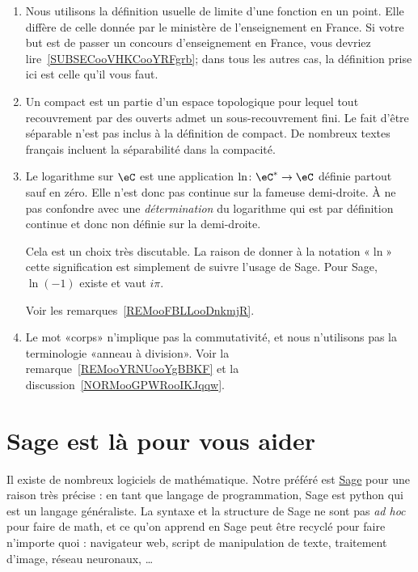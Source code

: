 \begin{enumerate}
    \item
        Nous utilisons la définition usuelle de limite d'une fonction en un point. Elle diffère de celle donnée par le ministère de l'enseignement en France. Si votre but est de passer un concours d'enseignement en France, vous devriez lire~\ref{SUBSECooVHKCooYRFgrb}; dans tous les autres cas, la définition prise ici est celle qu'il vous faut.
    \item
        Un compact est un partie d'un espace topologique pour lequel tout recouvrement par des ouverts admet un sous-recouvrement fini. Le fait d'être séparable n'est pas inclus à la définition de compact. De nombreux textes français incluent la séparabilité dans la compacité.
    \item
        Le logarithme sur \( \eC\) est une application \( \ln\colon \eC^*\to \eC\) définie partout sauf en zéro. Elle n'est donc pas continue sur la fameuse demi-droite. À ne pas confondre avec une \emph{détermination} du logarithme qui est par définition continue et donc non définie sur la demi-droite.

        Cela est un choix très discutable. La raison de donner à la notation «\( \ln\)» cette signification est simplement de suivre l'usage de Sage. Pour Sage, \( \ln(-1)\) existe et vaut \( i\pi\).

        Voir les remarques~\ref{REMooFBLLooDnkmjR}.
    \item
        Le mot «corps» n'implique pas la commutativité, et nous n'utilisons pas la terminologie «anneau à division». Voir la remarque~\ref{REMooYRNUooYgBBKF} et la discussion~\ref{NORMooGPWRooIKJqqw}.

\end{enumerate}

\section{Sage est là pour vous aider}

Il existe de nombreux logiciels de mathématique. Notre préféré est \href{http://www.sagemath.org}{Sage} pour une raison très précise : en tant que langage de programmation, Sage est python qui est un langage généraliste. La syntaxe et la structure de Sage ne sont pas \emph{ad hoc} pour faire de math, et ce qu'on apprend en Sage peut être recyclé pour faire n'importe quoi : navigateur web, script de manipulation de texte, traitement d'image, réseau neuronaux, \ldots

